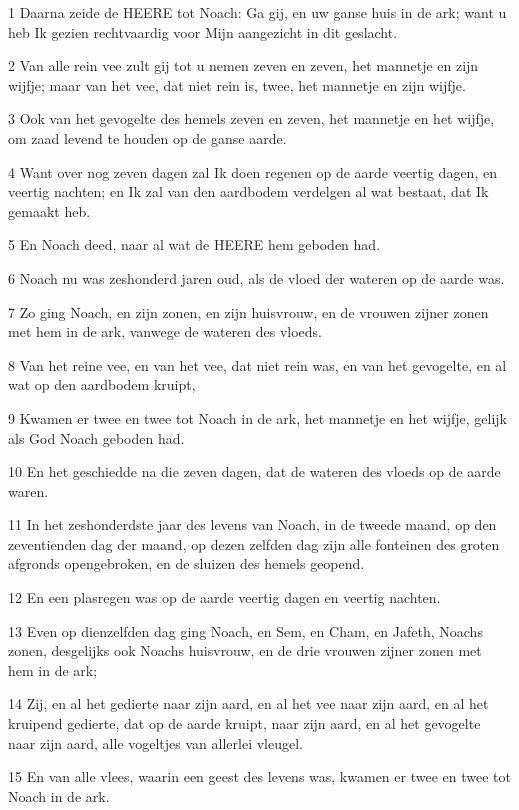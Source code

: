 \par 1 Daarna zeide de HEERE tot Noach: Ga gij, en uw ganse huis in de ark; want u heb Ik gezien rechtvaardig voor Mijn aangezicht in dit geslacht.
\par 2 Van alle rein vee zult gij tot u nemen zeven en zeven, het mannetje en zijn wijfje; maar van het vee, dat niet rein is, twee, het mannetje en zijn wijfje.
\par 3 Ook van het gevogelte des hemels zeven en zeven, het mannetje en het wijfje, om zaad levend te houden op de ganse aarde.
\par 4 Want over nog zeven dagen zal Ik doen regenen op de aarde veertig dagen, en veertig nachten; en Ik zal van den aardbodem verdelgen al wat bestaat, dat Ik gemaakt heb.
\par 5 En Noach deed, naar al wat de HEERE hem geboden had.
\par 6 Noach nu was zeshonderd jaren oud, als de vloed der wateren op de aarde was.
\par 7 Zo ging Noach, en zijn zonen, en zijn huisvrouw, en de vrouwen zijner zonen met hem in de ark, vanwege de wateren des vloeds.
\par 8 Van het reine vee, en van het vee, dat niet rein was, en van het gevogelte, en al wat op den aardbodem kruipt,
\par 9 Kwamen er twee en twee tot Noach in de ark, het mannetje en het wijfje, gelijk als God Noach geboden had.
\par 10 En het geschiedde na die zeven dagen, dat de wateren des vloeds op de aarde waren.
\par 11 In het zeshonderdste jaar des levens van Noach, in de tweede maand, op den zeventienden dag der maand, op dezen zelfden dag zijn alle fonteinen des groten afgronds opengebroken, en de sluizen des hemels geopend.
\par 12 En een plasregen was op de aarde veertig dagen en veertig nachten.
\par 13 Even op dienzelfden dag ging Noach, en Sem, en Cham, en Jafeth, Noachs zonen, desgelijks ook Noachs huisvrouw, en de drie vrouwen zijner zonen met hem in de ark;
\par 14 Zij, en al het gedierte naar zijn aard, en al het vee naar zijn aard, en al het kruipend gedierte, dat op de aarde kruipt, naar zijn aard, en al het gevogelte naar zijn aard, alle vogeltjes van allerlei vleugel.
\par 15 En van alle vlees, waarin een geest des levens was, kwamen er twee en twee tot Noach in de ark.
